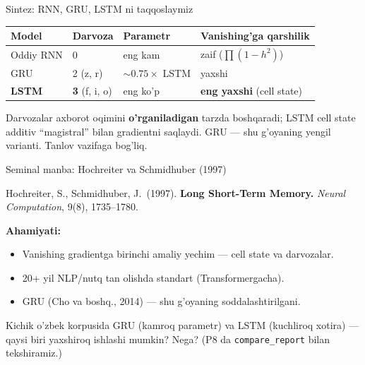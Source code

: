 \documentclass[aspectratio=169,11pt]{beamer}
\begin{document}
\begin{frame}{Sintez: RNN, GRU, LSTM ni taqqoslaymiz}
  \begin{center}\small
  \begin{tabular}{p{2.4cm}p{1.8cm}p{2.4cm}p{3.0cm}}
    \toprule
    \textbf{Model} & \textbf{Darvoza} & \textbf{Parametr} & \textbf{Vanishing'ga qarshilik} \\
    \midrule
    Oddiy RNN & 0 & eng kam & zaif ($\prod(1-h^2)$) \\
    GRU & 2 (z, r) & $\sim 0.75\times$ LSTM & yaxshi \\
    \textbf{LSTM} & \textbf{3} (f, i, o) & eng ko'p & \textbf{eng yaxshi} (cell state) \\
    \bottomrule
  \end{tabular}
  \end{center}
  \vspace{4pt}
  \begin{tcolorbox}[okbox,title=Asosiy g'oya,top=2pt,bottom=2pt]
    \footnotesize
    Darvozalar axborot oqimini \textbf{o'rganiladigan} tarzda boshqaradi; LSTM
    cell state additiv ``magistral'' bilan gradientni saqlaydi. GRU --- shu g'oyaning
    yengil varianti. Tanlov vazifaga bog'liq.
  \end{tcolorbox}
\end{frame}

\begin{frame}{Seminal manba: Hochreiter va Schmidhuber (1997)}
  \begin{tcolorbox}[defbox,title=Manba]
    \small
    Hochreiter, S., Schmidhuber, J.\ (1997). \textbf{Long Short-Term Memory.}
    \textit{Neural Computation}, 9(8), 1735--1780.
  \end{tcolorbox}
  \vspace{5pt}
  \textbf{Ahamiyati:}
  \begin{itemize}\small\setlength\itemsep{3pt}
    \item Vanishing gradientga birinchi amaliy yechim --- cell state va darvozalar.
    \item 20+ yil NLP/nutq tan olishda standart (Transformergacha).
    \item GRU (Cho va boshq., 2014) --- shu g'oyaning soddalashtirilgani.
  \end{itemize}
  \vspace{5pt}
  \begin{tcolorbox}[warnbox,title=Muhokama savoli (P8 gacha o'ylang)]
    \small
    Kichik o'zbek korpusida GRU (kamroq parametr) va LSTM (kuchliroq xotira) ---
    qaysi biri yaxshiroq ishlashi mumkin? Nega? (P8 da \texttt{compare\_report} bilan
    tekshiramiz.)
  \end{tcolorbox}
\end{frame}
\end{document}
